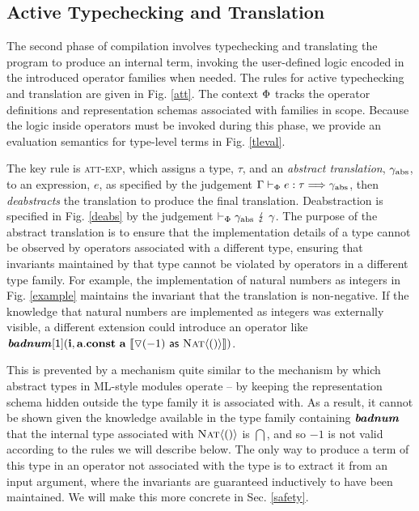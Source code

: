 \documentclass{llncs}
\begin{document}
\subsection{Active Typechecking and Translation}
The second phase of compilation involves typechecking and translating the program to produce an internal term, invoking the user-defined logic encoded in the introduced operator families when needed. The rules for active typechecking and translation are given in Fig. \ref{att}. The context $\Phi$ tracks the operator definitions and representation schemas associated with families in scope. Because the logic inside operators must be invoked during this phase, we provide an evaluation semantics for type-level terms in Fig. \ref{tleval}. 

The key rule is \textsc{att-exp}, which assigns a type, $\tau$, and an \emph{abstract translation}, $\gamma_{\text{abs}}$, to an expression, $e$, as specified by the judgement $\Gamma \vdash_{\Phi} e : \tau \Longrightarrow \gamma_{\text{abs}}$, then \emph{deabstracts} the translation to produce the final translation. Deabstraction is specified in Fig. \ref{deabs} by the judgement $\vdash_{\Phi} \gamma_{\text{abs}} ~\lightning~ \gamma$. The purpose of the abstract translation is to ensure that the implementation details of a type cannot be observed by operators associated with a different type, ensuring that invariants maintained by that type cannot be violated by operators in a different type family. For example, the implementation of natural numbers as integers in Fig. \ref{example} maintains the invariant that the translation is non-negative. If the knowledge that natural numbers are implemented as integers was externally visible, a different extension could introduce an operator like $\textbf{\textit{badnum}}[\textsf{1}]({\textbf{i}},{\textbf{a}}.{\textbf{const}}~{\textbf{a}}~\llbracket \triangledown(-1)~{\sf as}~\textsc{Nat}\langle()\rangle \rrbracket)$.

This is prevented by a mechanism quite similar to the mechanism by which abstract types in ML-style modules operate \cite{atapl} -- by keeping the representation schema hidden outside the type family it is associated with. As a result, it cannot be shown given the knowledge available in the type family containing $\textbf{\textit{badnum}}$ that the internal type associated with $\textsc{Nat}\langle()\rangle$ is $\dint$, and so $-1$ is not valid according to the rules we will describe below. The only way to produce a term of this type in an operator not associated with the type is to extract it from an input argument, where the invariants are guaranteed inductively to have been  maintained. We will make this more concrete in Sec. \ref{safety}.
\end{document}
